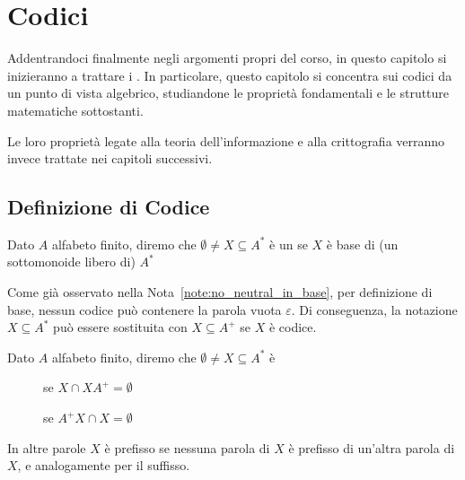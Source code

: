 \chapter{Codici}

Addentrandoci finalmente negli argomenti propri del corso, in questo capitolo si inizieranno a trattare i .
In particolare, questo capitolo si concentra sui codici da un punto di vista algebrico, studiandone le proprietà fondamentali e le strutture matematiche sottostanti.

Le loro proprietà legate alla teoria dell'informazione e alla crittografia verranno invece trattate nei capitoli successivi.

\section{Definizione di Codice}
\begin{definition}[Codice]
  Dato \(A\) alfabeto finito, diremo che \(\emptyset \neq X \subseteq A^*\) è un  se \(X\) è base di (un sottomonoide libero di) \(A^*\)
\end{definition}

\begin{note}
  Come già osservato nella Nota~\ref{note:no_neutral_in_base}, per definizione di base, nessun codice può contenere la parola vuota \(\varepsilon\).
  Di conseguenza, la notazione \(X \subseteq A^*\) può essere sostituita con \(X \subseteq A^+\) se \(X\) è codice.
\end{note}

\begin{definition}
  Dato \(A\) alfabeto finito, diremo che \(\emptyset \neq X \subseteq A^*\) è
  \begin{description}
    \item[] se \(X\cap XA^+ = \emptyset\)
    \item[] se \(A^+X \cap X = \emptyset\)
  \end{description}
\end{definition}

In altre parole \(X\) è prefisso se nessuna parola di \(X\) è prefisso di un'altra parola di \(X\), e analogamente per il suffisso.

